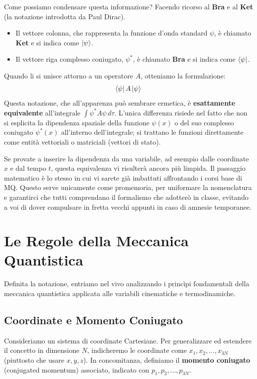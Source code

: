 Come possiamo condensare questa informazione? Facendo ricorso al \textbf{Bra} e al \textbf{Ket} (la notazione introdotta da Paul Dirac).
\begin{itemize}
\item Il vettore colonna, che rappresenta la funzione d'onda standard $\psi$, è chiamato \textbf{Ket} e si indica come $\ket{\psi}$.
\item Il vettore riga complesso coniugato, $\psi^*$, è chiamato \textbf{Bra} e si indica come $\bra{\psi}$.
\end{itemize}

Quando li si unisce attorno a un operatore $A$, otteniamo la formulazione:
\begin{equation}
\bra{\psi} A \ket{\psi}
\end{equation}
Questa notazione, che all'apparenza può sembrare ermetica, è \textbf{esattamente equivalente} all'integrale $\int \psi^* A \psi \, d\tau$. L'unica differenza risiede nel fatto che non si esplicita la dipendenza spaziale della funzione $\psi(x)$ o del suo complesso coniugato $\psi^*(x)$ all'interno dell'integrale; si trattano le funzioni direttamente come entità vettoriali o matriciali (vettori di stato).

Se provate a inserire la dipendenza da una variabile, ad esempio dalle coordinate $x$ e dal tempo $t$, questa equivalenza vi risulterà ancora più limpida. Il passaggio matematico è lo stesso in cui vi sarete già imbattuti affrontando i corsi base di MQ. Questo serve unicamente come promemoria, per uniformare la nomenclatura e garantirci che tutti comprendano il formalismo che adotterò in classe, evitando a voi di dover compulsare in fretta vecchi appunti in caso di amnesie temporanee.

\section{Le Regole della Meccanica Quantistica}

Definita la notazione, entriamo nel vivo analizzando i princìpi fondamentali della meccanica quantistica applicata alle variabili cinematiche e termodinamiche.

\subsection{Coordinate e Momento Coniugato}

Consideriamo un sistema di coordinate Cartesiane. Per generalizzare ed estendere il concetto in dimensione $N$, indicheremo le coordinate come $x_1, x_2, \ldots, x_{3N}$ (piuttosto che usare $x, y, z$).
In concomitanza, definiamo il \textbf{momento coniugato} (conjugated momentum) associato, indicato con $p_1, p_2, \ldots, p_{3N}$.

